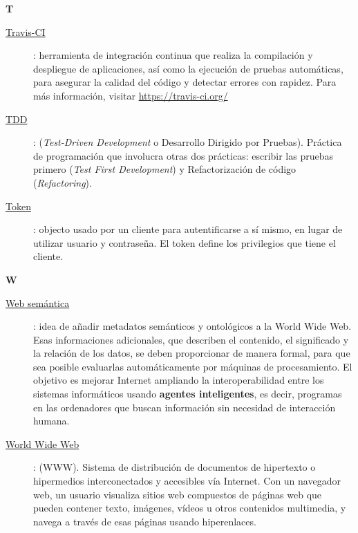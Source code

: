 \newpage
{\bfseries {\Huge T}}\label{Apendice1:T}
\bigskip
\bigskip

\begin{description}
  \item[\underline{Travis-CI}\label{apend1:travis}]: herramienta de integración continua que realiza la compilación y despliegue de aplicaciones, así como la ejecución de pruebas automáticas, para asegurar la calidad del código y detectar errores con rapidez. Para más información, visitar {\small \url{https://travis-ci.org/}}
  \bigskip
\end{description}

\begin{description}
  \item[\underline{TDD}\label{apend1:tdd}]: (\textit{Test-Driven Development} o Desarrollo Dirigido por Pruebas). Práctica de programación que involucra otras dos prácticas: escribir las pruebas primero (\textit{Test First Development}) y Refactorización de código (\textit{Refactoring}).
  \bigskip
\end{description}

\begin{description}
  \item[\underline{Token}\label{apend1:token}]: objecto usado por un cliente para autentificarse a sí mismo, en lugar de utilizar usuario y contraseña. El token define los privilegios que tiene el cliente.
  \bigskip
\end{description}

\bigskip
{\bfseries {\Huge W}}\label{Apendice1:W}
\bigskip
\bigskip

\begin{description}
  \item[\underline{Web semántica}\label{apend1:web}]: idea de añadir metadatos semánticos y ontológicos a la World Wide Web. Esas informaciones adicionales, que describen el contenido, el significado y la relación de los datos, se deben proporcionar de manera formal, para que sea posible evaluarlas automáticamente por máquinas de procesamiento. El objetivo es mejorar Internet ampliando la interoperabilidad entre los sistemas informáticos usando {\bfseries agentes inteligentes}, es decir, programas en las ordenadores que buscan información sin necesidad de interacción humana.
  \bigskip
\end{description}

\begin{description}
  \item[\underline{World Wide Web}\label{apend1:www}]: (WWW). Sistema de distribución de documentos de hipertexto o hipermedios interconectados y accesibles vía Internet. Con un navegador web, un usuario visualiza sitios web compuestos de páginas web que pueden contener texto, imágenes, vídeos u otros contenidos multimedia, y navega a través de esas páginas usando hiperenlaces.
  \bigskip
\end{description}